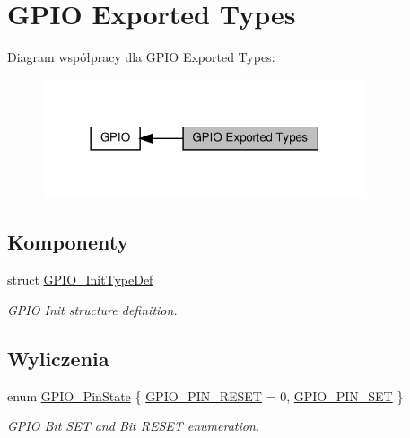 \hypertarget{group___g_p_i_o___exported___types}{}\section{G\+P\+IO Exported Types}
\label{group___g_p_i_o___exported___types}
Diagram współpracy dla G\+P\+IO Exported Types\+:\nopagebreak
\begin{figure}[H]
\begin{center}
\leavevmode
\includegraphics[width=270pt]{group___g_p_i_o___exported___types}
\end{center}
\end{figure}
\subsection*{Komponenty}
\begin{DoxyCompactItemize}
\item 
struct \hyperlink{struct_g_p_i_o___init_type_def}{G\+P\+I\+O\+\_\+\+Init\+Type\+Def}
\begin{DoxyCompactList}\small\item\em G\+P\+IO Init structure definition. \end{DoxyCompactList}\end{DoxyCompactItemize}
\subsection*{Wyliczenia}
\begin{DoxyCompactItemize}
\item 
enum \hyperlink{group___g_p_i_o___exported___types_ga5b3ef0486b179415581eb342e0ea6b43}{G\+P\+I\+O\+\_\+\+Pin\+State} \{ \hyperlink{group___g_p_i_o___exported___types_gga5b3ef0486b179415581eb342e0ea6b43a90af2af95004ea61d76950ff3f2f6ec2}{G\+P\+I\+O\+\_\+\+P\+I\+N\+\_\+\+R\+E\+S\+ET} = 0, 
\hyperlink{group___g_p_i_o___exported___types_gga5b3ef0486b179415581eb342e0ea6b43a746c062509db3ad1e47beed7527f9f8a}{G\+P\+I\+O\+\_\+\+P\+I\+N\+\_\+\+S\+ET}
 \}\begin{DoxyCompactList}\small\item\em G\+P\+IO Bit S\+ET and Bit R\+E\+S\+ET enumeration. \end{DoxyCompactList}
\end{DoxyCompactItemize}


